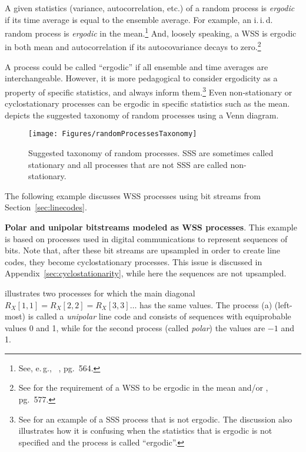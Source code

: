 A given statistics (variance, autocorrelation, etc.) of a random process is 
\emph{ergodic} if its time average is equal to the ensemble average. 
For example, an i.\,i.\,d. random process 
is \emph{ergodic} in the mean.\footnote{See, e.\,g., ~\cite{Kay06}, pg.~564.} And, loosely speaking,
 a WSS is ergodic in both mean and autocorrelation if its autocovariance decays to zero.\footnote{See 
 for the
requirement of a WSS to be ergodic in the mean and/or \cite{Kay06}, pg.~577.}

A process could be called ``ergodic'' if all ensemble and time averages are interchangeable.
However, it is more pedagogical to consider ergodicity as a property of specific statistics, and always inform them.\footnote{See
 for an example of a SSS process that is not ergodic. The discussion also illustrates how it is confusing when the statistics that is ergodic is not specified and the process is called ``ergodic''.}
Even non-stationary or cyclostationary processes can be ergodic in specific statistics such
as the mean.
 depicts the suggested taxonomy of random processes using a Venn diagram.

\begin{figure}[htbp]
\centering
\texttt{[image: Figures/randomProcessesTaxonomy]}
\caption[Suggested taxonomy of random processes.]{Suggested taxonomy of random processes. SSS are sometimes called stationary and all processes that are not SSS are called non-stationary.\label{fig:randomProcessesTaxonomy}}
\end{figure}

\ifml
\else
The following example discusses WSS processes using bit streams from Section~\ref{sec:linecodes}.
\fi

\bExample \textbf{Polar and unipolar bitstreams modeled as WSS processes}.
\label{ex:polarUnipolarWSS}
This example is based on processes used in digital communications to represent sequences of 
bits.
Note that, after these bit streams are upsampled in order to create line codes, they become cyclostationary processes. This issue is discussed in Appendix~\ref{sec:cyclostationarity}, while here the sequences are not upsampled.

 illustrates two processes for which the main diagonal $R_X[1,1]=R_X[2,2]=R_X[3,3] \ldots$ has the same values. The process (a) (left-most) is called a \emph{unipolar} line code and consists of sequences with equiprobable values 0 and 1, while for the second process (called \emph{polar}) the values are $-1$ and 1.

